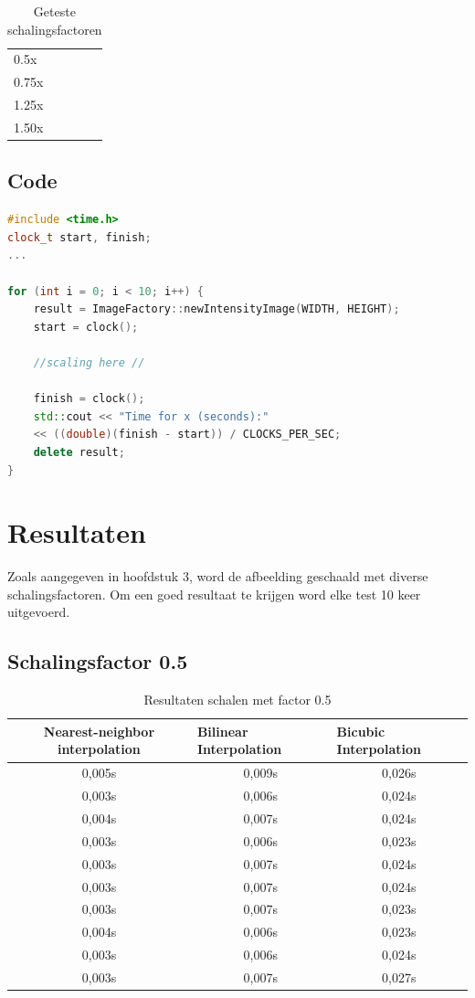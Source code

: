 \documentclass{article}
\begin{document}
\begin{table}[h] \centering
\begin{tabular}{l}
    0.5x \\
    0.75x \\
    1.25x \\
    1.50x \\
\end{tabular}
\caption{Geteste schalingsfactoren}
\end{table}

\newpage
\subsection{Code}

\begin{lstlisting}[language=C++, caption=Code voor timen]
#include <time.h>
clock_t start, finish;
...

for (int i = 0; i < 10; i++) {
    result = ImageFactory::newIntensityImage(WIDTH, HEIGHT);
    start = clock();
    
    //scaling here //
    
    finish = clock();
    std::cout << "Time for x (seconds):"
    << ((double)(finish - start)) / CLOCKS_PER_SEC;
    delete result;
}
\end{lstlisting}

\clearpage
\section{Resultaten}
Zoals aangegeven in hoofdstuk 3, word de afbeelding geschaald met diverse schalingsfactoren. Om een goed resultaat te krijgen word elke test 10 keer uitgevoerd. 

\subsection{Schalingsfactor 0.5}

\begin{table}[H]
    \centering
    \begin{tabular}{ccc}
        \toprule
            Nearest-neighbor interpolation & \multicolumn{1}{l}{Bilinear Interpolation} &\multicolumn{1}{l}{Bicubic Interpolation} \\
        \midrule
            0,005s & 0,009s & 0,026s  \\
            0,003s & 0,006s & 0,024s  \\
            0,004s & 0,007s & 0,024s  \\
            0,003s & 0,006s & 0,023s  \\
            0,003s & 0,007s & 0,024s  \\
            0,003s & 0,007s & 0,024s  \\
            0,003s & 0,007s & 0,023s  \\
            0,004s & 0,006s & 0,023s  \\
            0,003s & 0,006s & 0,024s  \\
            0,003s & 0,007s & 0,027s  \\
    \end{tabular}
    \caption{Resultaten schalen met factor 0.5}
\end{table}
\end{document}
